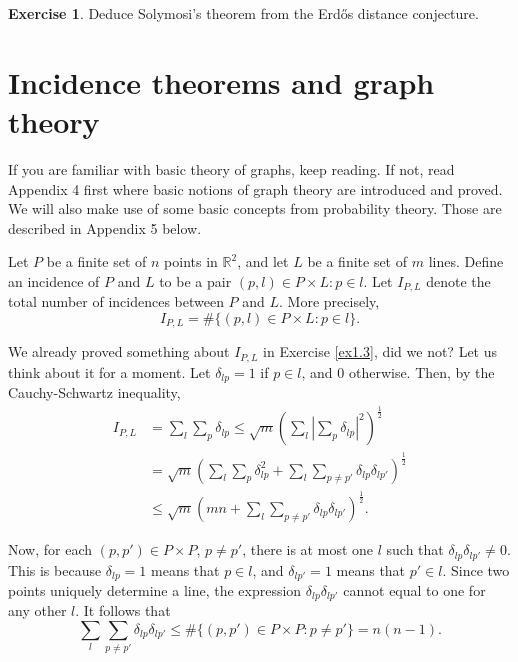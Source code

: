 \documentclass[]{amsart}
\numberwithin{equation}{section}
\theoremstyle{plain}
\theoremstyle{definition}
\newtheorem{exercise}{Exercise}[section]
\theoremstyle{remark}
\begin{document}
\begin{exercise} \label{ex2.6}
Deduce Solymosi's theorem from the Erd\H{o}s
distance conjecture. \end{exercise}


\section{Incidence theorems and graph theory}


If you are familiar with basic theory of graphs, keep reading. If
not, read Appendix 4 first where basic notions of graph theory are
introduced and proved. We will also make use of some basic
concepts from probability theory. Those are described in Appendix 5
below.

Let $P$ be a finite set of $n$ points in $\mathbb{R}^2$, and let
$L$ be a finite set of $m$ lines. Define an incidence of $P$ and
$L$ to be a pair $(p,l) \in P \times L: p \in l$. Let $I_{P,L}$ denote
the total number of incidences between $P$ and $L$. More precisely,
\begin{equation}
I_{P,L}=\# \{(p,l) \in P \times L: p \in l\}.
\end{equation}



We already proved something about $I_{P,L}$ in
Exercise \ref{ex1.3}, did
we not? Let us think about it for a moment. Let $\delta_{lp}=1$ if
$p \in l$, and $0$ otherwise. Then, by the Cauchy-Schwartz inequality,
\begin{equation}
\begin{split}
 I_{P,L}&=\sum_l \sum_p \delta_{lp} \leq \sqrt{m} {\left( \sum_l
{\left|\sum_p \delta_{lp} \right|}^2 \right)}^{\frac{1}{2}}\\
&=\sqrt{m} {\left( \sum_l \sum_p \delta^2_{lp}+
\sum_l \sum_{p \not=p'} \delta_{lp}\delta_{lp'} \right)}^{\frac{1}{2}}\\
&\leq \sqrt{m} {\left(mn+\sum_l \sum_{p \not=p'} \delta_{lp}\delta_{lp'}
\right)}^{\frac{1}{2}}.
\end{split}
\end{equation}


Now, for each $(p,p') \in P \times P$, $p \not=p'$, there is at most one $l$
such that $\delta_{lp}\delta_{lp'} \not=0$. This is because $\delta_{lp}=1$
means that $p \in l$, and $\delta_{lp'}=1$ means that $p' \in l$. Since two
points uniquely determine a line, the expression $\delta_{lp}\delta_{lp'}$
cannot equal to one for any other $l$. It follows that
\begin{equation}
\sum_l \sum_{p \not=p'} \delta_{lp}\delta_{lp'} \leq \# \{(p,p') \in P \times P:
p \not=p'\}=n(n-1).
\end{equation}
\end{document}
